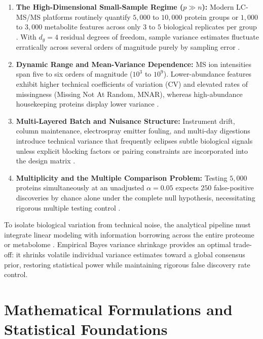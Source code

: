 \documentclass[11pt,twoside,openright]{book}
\begin{document}
\begin{enumerate}
    \item \textbf{The High-Dimensional Small-Sample Regime ($p \gg n$):} Modern LC-MS/MS platforms routinely quantify $5,000$ to $10,000$ protein groups or $1,000$ to $3,000$ metabolite features across only $3$ to $5$ biological replicates per group \cite{navarro2016multicenter}. With $d_g = 4$ residual degrees of freedom, sample variance estimates fluctuate erratically across several orders of magnitude purely by sampling error \cite{smyth2004linear, ritchie2015limma}.
    \item \textbf{Dynamic Range and Mean-Variance Dependence:} MS ion intensities span five to six orders of magnitude ($10^3$ to $10^9$). Lower-abundance features exhibit higher technical coefficients of variation (CV) and elevated rates of missingness (Missing Not At Random, MNAR), whereas high-abundance housekeeping proteins display lower variance \cite{karpievitch2012statistical, lazar2016accounting}.
    \item \textbf{Multi-Layered Batch and Nuisance Structure:} Instrument drift, column maintenance, electrospray emitter fouling, and multi-day digestions introduce technical variance that frequently eclipses subtle biological signals unless explicit blocking factors or pairing constraints are incorporated into the design matrix \cite{johnson2007adjusting, leek2010tackling}.
    \item \textbf{Multiplicity and the Multiple Comparison Problem:} Testing $5,000$ proteins simultaneously at an unadjusted $\alpha = 0.05$ expects $250$ false-positive discoveries by chance alone under the complete null hypothesis, necessitating rigorous multiple testing control \cite{broadhurst2006statistical, benjamini1995controlling, storey2003statistical}.
\end{enumerate}

To isolate biological variation from technical noise, the analytical pipeline must integrate linear modeling with information borrowing across the entire proteome or metabolome \cite{boland2023health, xia2009metaboanalyst, gentleman2005bioinformatics}. Empirical Bayes variance shrinkage provides an optimal trade-off: it shrinks volatile individual variance estimates toward a global consensus prior, restoring statistical power while maintaining rigorous false discovery rate control.

\section{Mathematical Formulations and Statistical Foundations}
\end{document}
